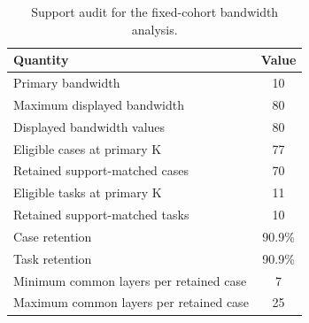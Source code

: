 \begin{table}[t]
\centering
\caption{Support audit for the fixed-cohort bandwidth analysis.}
\label{tab:bandwidth_support_audit}
\small
\begin{tabular}{lc}
\toprule
\textbf{Quantity} & \textbf{Value} \\
\midrule
Primary bandwidth & 10 \\
Maximum displayed bandwidth & 80 \\
Displayed bandwidth values & 80 \\
Eligible cases at primary K & 77 \\
Retained support-matched cases & 70 \\
Eligible tasks at primary K & 11 \\
Retained support-matched tasks & 10 \\
Case retention & 90.9\% \\
Task retention & 90.9\% \\
Minimum common layers per retained case & 7 \\
Maximum common layers per retained case & 25 \\
\bottomrule
\end{tabular}
\end{table}
